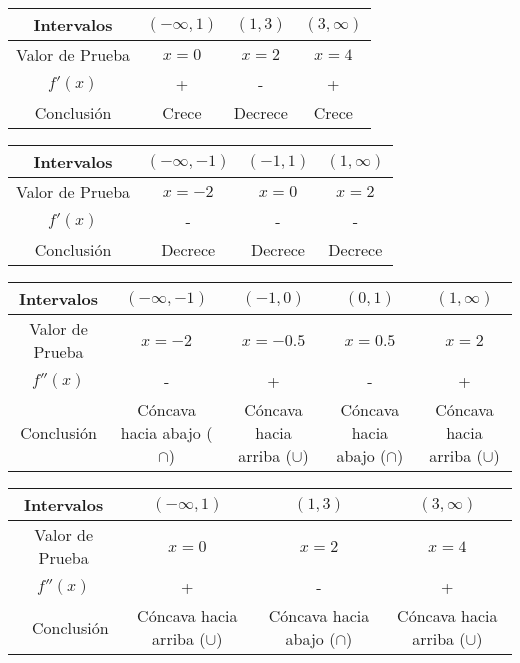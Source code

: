 \begin{center}
    \begin{tabular}{|c|c|c|c|}
        \hline
        Intervalos & $(-\infty,1)$ & $(1,3)$ & $(3,\infty)$ \\
        \hline
        Valor de Prueba & $x=0$ & $x=2$ & $x=4$ \\
        \hline
        $f'(x)$ & + & - & + \\
        \hline
        Conclusión & Crece & Decrece & Crece \\
        \hline
    \end{tabular}
\end{center}

\begin{center}
    \begin{tabular}{|c|c|c|c|}
        \hline
        Intervalos & $(-\infty,-1)$ & $(-1,1)$ & $(1,\infty)$ \\
        \hline
        Valor de Prueba & $x=-2$ & $x=0$ & $x=2$ \\
        \hline
        $f'(x)$ & - & - & - \\
        \hline
        Conclusión & Decrece & Decrece & Decrece \\
        \hline
    \end{tabular}
\end{center}

\begin{center}
    \begin{tabular}{|c|c|c|c|c|}
        \hline
        Intervalos & $(-\infty,-1)$ & $(-1,0)$ & $(0,1)$ & $(1,\infty)$ \\
        \hline
        Valor de Prueba & $x=-2$ & $x=-0.5$ & $x=0.5$ & $x=2$ \\
        \hline
        $f''(x)$ & - & + & - & + \\
        \hline
        Conclusión & Cóncava hacia abajo ($\cap$) & Cóncava hacia arriba ($\cup$) & Cóncava hacia abajo ($\cap$) & Cóncava hacia arriba ($\cup$) \\
        \hline
    \end{tabular}
\end{center}

\begin{center}
    \begin{tabular}{|c|c|c|c|}
        \hline
        Intervalos & $(-\infty,1)$ & $(1,3)$ & $(3,\infty)$ \\
        \hline
        Valor de Prueba & $x=0$ & $x=2$ & $x=4$ \\
        \hline
        $f''(x)$ & + & - & + \\
        \
        \hline
        Conclusión & Cóncava hacia arriba ($\cup$) & Cóncava hacia abajo ($\cap$) & Cóncava hacia arriba ($\cup$) \\
        \hline
    \end{tabular}
\end{center}

